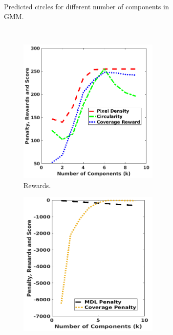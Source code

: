 \begin{figure}[!hbpt]
\begin{subfigure}{\textwidth}
   \caption{Predicted circles for different number of components in GMM.}
   \label{fig:gmmsyn}
   \end{subfigure}\\ \begin{subfigure}{\textwidth}
   \centering
   \begin{subfigure}{.32\textwidth}
   \centering
            \includegraphics[width = \textwidth]{figures/counting/iserscorepart11.png} 
            \caption{Rewards.}
        \label{fig:gmmkplotrew}               
       \end{subfigure}\begin{subfigure}{.32\textwidth}  
       \centering
       \includegraphics[width = \textwidth]{figures/counting/iserscorepart22.png} 

\end{subfigure}
\end{subfigure}
\end{figure}
